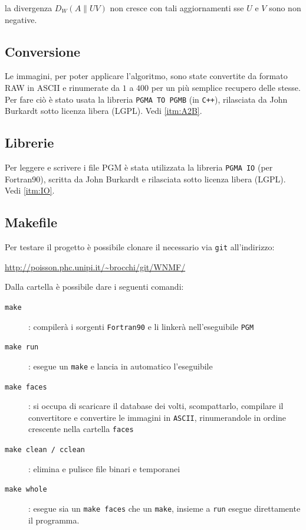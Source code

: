 \documentclass[a4paper]{article} %
\begin{document}
la divergenza $D_W(A\lVert UV)$ non cresce con tali aggiornamenti sse $U$ e $V$ sono non negative.

\subsection{Conversione}\label{subsec:conversione}
Le immagini, per poter applicare l'algoritmo, sono state convertite da formato RAW in ASCII e rinumerate da $1$ a $400$ per un più semplice recupero delle stesse. Per fare ciò è stato usata la libreria \texttt{PGMA TO PGMB} 
(in \texttt{C++}), rilasciata da John Burkardt sotto licenza libera (LGPL).
Vedi \ref{itm:A2B}.

\subsection{Librerie} 
Per leggere e scrivere i file PGM è stata utilizzata la libreria \texttt{PGMA IO} (per Fortran90), scritta da John Burkardt e rilasciata sotto licenza libera (LGPL).
Vedi \ref{itm:IO}.

\subsection{Makefile}
Per testare il progetto è possibile clonare il necessario via \texttt{git} all'indirizzo:\\
\begin{center} \url{http://poisson.phc.unipi.it/~brocchi/git/WNMF/} \end{center}

Dalla cartella è possibile dare i seguenti comandi:
\begin{description}
\item[\texttt{make}]: compilerà i sorgenti \texttt{Fortran90} e li linkerà nell'eseguibile \texttt{PGM}
\item[\texttt{make run}]: esegue un \texttt{make} e lancia in automatico l'eseguibile
\item[\texttt{make faces}]: si occupa di scaricare il database dei volti, scompattarlo, compilare il convertitore e convertire le immagini in \texttt{ASCII}, rinumerandole in ordine crescente nella cartella \texttt{faces}
\item[\texttt{make clean / cclean}]: elimina e pulisce file binari e temporanei
\item[\texttt{make whole}]: esegue sia un \texttt{make faces} che un \texttt{make}, insieme a \texttt{run} esegue direttamente il programma.
\end{description}
\end{document}
